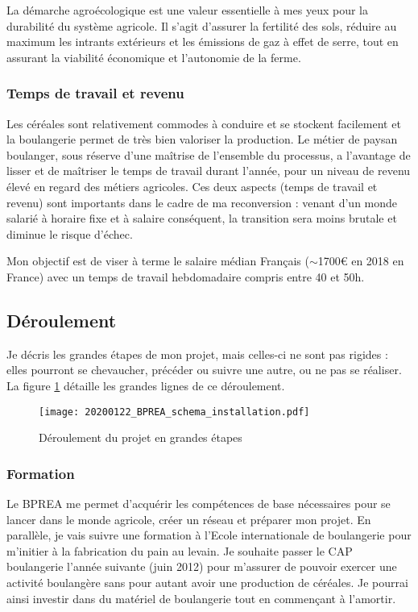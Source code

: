 \documentclass{article}
\begin{document}
La démarche agroécologique est une valeur essentielle à mes yeux pour la durabilité du système agricole. Il s'agit d'assurer la fertilité des sols, réduire au maximum les intrants extérieurs et les émissions de gaz à effet de serre, tout en assurant la viabilité économique et l'autonomie de la ferme. 

\subsubsection*{Temps de travail et revenu}

Les céréales sont relativement commodes à conduire et se stockent facilement et la boulangerie permet de très bien valoriser la production. Le métier de paysan boulanger, sous réserve d'une maîtrise de l'ensemble du processus, a l'avantage de lisser et de maîtriser le temps de travail durant l'année, pour un niveau de revenu élevé en regard des métiers agricoles. Ces deux aspects (temps de travail et revenu) sont importants dans le cadre de ma reconversion : venant d'un monde salarié à horaire fixe et à salaire conséquent, la transition sera moins brutale et diminue le risque d'échec. 

Mon objectif est de viser à terme le salaire médian Français ($\sim$1700\euro{} en 2018 en France) avec un temps de travail hebdomadaire compris entre 40 et 50h.

\subsection{Déroulement}

Je décris les grandes étapes de mon projet, mais celles-ci ne sont pas rigides : elles pourront se chevaucher, précéder ou suivre une autre, ou ne pas se réaliser. La figure \ref{fig_1} détaille les grandes lignes de ce déroulement.

\begin{figure}[h!]
\centering
		\texttt{[image: 20200122\_BPREA\_schema\_installation.pdf]}
		\label{fig_1}
		\caption{Déroulement du projet en grandes étapes}
\end{figure}

\subsubsection*{Formation}

Le BPREA me permet d'acquérir les compétences de base nécessaires pour se lancer dans le monde agricole, créer un réseau et préparer mon projet. En parallèle, je vais suivre une formation à l'Ecole internationale de boulangerie pour m'initier à la fabrication du pain au levain. Je souhaite passer le CAP boulangerie l'année suivante (juin 2012) pour m'assurer de pouvoir exercer une activité boulangère sans pour autant avoir une production de céréales. Je pourrai ainsi investir dans du matériel de boulangerie tout en commençant à l'amortir.
\end{document}
